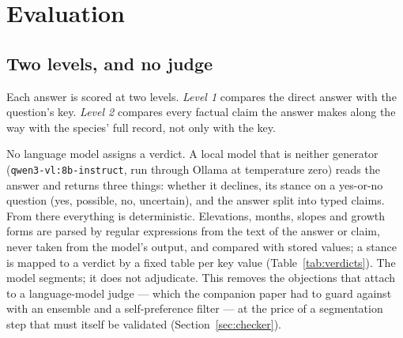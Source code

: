 \documentclass[11pt,a4paper]{article}
\begin{document}
\section{Evaluation}\label{sec:evaluation}

\subsection{Two levels, and no judge}
Each answer is scored at two levels. \emph{Level 1} compares the direct answer with
the question's key. \emph{Level 2} compares every factual claim the answer makes
along the way with the species' full record, not only with the key.

No language model assigns a verdict. A local model that is neither generator
(\texttt{qwen3-vl:8b-instruct}, run through Ollama at temperature zero) reads the
answer and returns three things: whether it declines, its stance on a yes-or-no
question (yes, possible, no, uncertain), and the answer split into typed claims. From
there everything is deterministic. Elevations, months, slopes and growth forms are
parsed by regular expressions from the text of the answer or claim, never taken from
the model's output, and compared with stored values; a stance is mapped to a verdict
by a fixed table per key value (Table~\ref{tab:verdicts}). The model segments; it
does not adjudicate. This removes the objections that attach to a language-model
judge \citep{zheng2023judge} --- which the companion paper had to guard against with
an ensemble and a self-preference filter --- at the price of a segmentation step
that must itself be validated (Section~\ref{sec:checker}).
\end{document}
